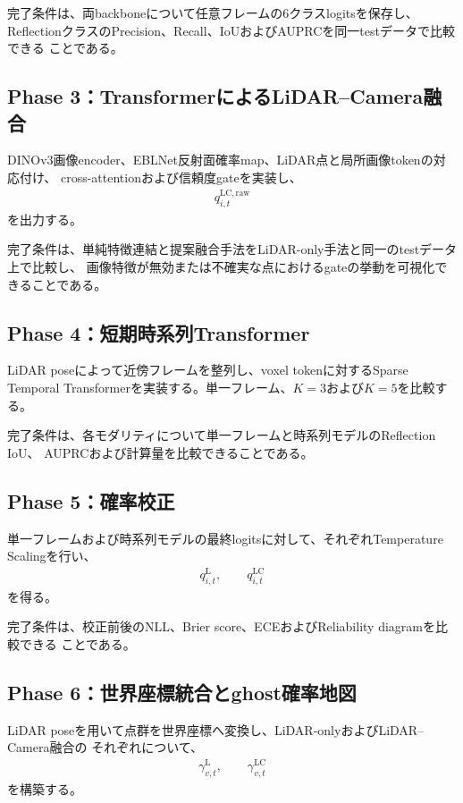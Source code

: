 \documentclass[uplatex,a4paper,11pt]{jsarticle}
\begin{document}
完了条件は、両backboneについて任意フレームの6クラスlogitsを保存し、
ReflectionクラスのPrecision、Recall、IoUおよびAUPRCを同一testデータで比較できる
ことである。

\subsection{Phase 3：TransformerによるLiDAR--Camera融合}

DINOv3画像encoder、EBLNet反射面確率map、LiDAR点と局所画像tokenの対応付け、
cross-attentionおよび信頼度gateを実装し、
\begin{align}
  q_{i,t}^{\mathrm{LC,raw}}
\end{align}
を出力する。

完了条件は、単純特徴連結と提案融合手法をLiDAR-only手法と同一のtestデータ上で比較し、
画像特徴が無効または不確実な点におけるgateの挙動を可視化できることである。

\subsection{Phase 4：短期時系列Transformer}

LiDAR poseによって近傍フレームを整列し、voxel tokenに対するSparse Temporal
Transformerを実装する。単一フレーム、$K=3$および$K=5$を比較する。

完了条件は、各モダリティについて単一フレームと時系列モデルのReflection IoU、
AUPRCおよび計算量を比較できることである。

\subsection{Phase 5：確率校正}

単一フレームおよび時系列モデルの最終logitsに対して、それぞれTemperature Scalingを行い、
\begin{align}
  q_{i,t}^{\mathrm{L}},
  \qquad
  q_{i,t}^{\mathrm{LC}}
\end{align}
を得る。

完了条件は、校正前後のNLL、Brier score、ECEおよびReliability diagramを比較できる
ことである。

\subsection{Phase 6：世界座標統合とghost確率地図}

LiDAR poseを用いて点群を世界座標へ変換し、LiDAR-onlyおよびLiDAR--Camera融合の
それぞれについて、
\begin{align}
  \gamma_{v,t}^{\mathrm{L}},
  \qquad
  \gamma_{v,t}^{\mathrm{LC}}
\end{align}
を構築する。
\end{document}
